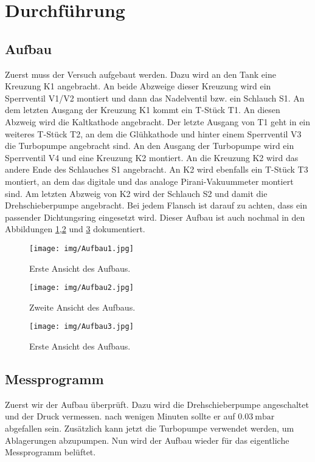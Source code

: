 \section{Durchführung}
\label{sec:Durchführung}
\subsection{Aufbau}
Zuerst muss der Versuch aufgebaut werden. Dazu wird an den Tank eine Kreuzung K1 angebracht. An beide Abzweige dieser Kreuzung wird ein Sperrventil V1/V2
montiert und dann das Nadelventil bzw. ein Schlauch S1. An dem letzten Ausgang der Kreuzung K1 kommt ein T-Stück T1. An diesen Abzweig wird die Kaltkathode
angebracht. Der letzte Ausgang von T1 geht in ein weiteres T-Stück T2, an dem die Glühkathode und hinter einem Sperrventil V3 die Turbopumpe angebracht sind.
An den Ausgang der Turbopumpe wird ein Sperrventil V4 und eine Kreuzung K2 montiert. An die Kreuzung K2 wird das andere Ende des Schlauches S1 angebracht. An K2
wird ebenfalls ein T-Stück T3 montiert, an dem das digitale und das analoge Pirani-Vakuummeter montiert sind. Am letzten Abzweig von K2 wird der Schlauch S2 und
damit die Drehschieberpumpe angebracht. Bei jedem Flansch ist darauf zu achten, dass ein passender Dichtungsring eingesetzt wird. Dieser Aufbau ist auch
nochmal in den Abbildungen \ref{img:ab1},\ref{img:ab2} und \ref{img:ab3} dokumentiert.
\begin{figure}
	\centering
	\texttt{[image: img/Aufbau1.jpg]}
	\caption{Erste Ansicht des Aufbaus.}
	\label{img:ab1}
\end{figure}
\begin{figure}
	\centering
	\texttt{[image: img/Aufbau2.jpg]}
	\caption{Zweite Ansicht des Aufbaus.}
	\label{img:ab2}
\end{figure}
\begin{figure}
	\centering
	\texttt{[image: img/Aufbau3.jpg]}
	\caption{Erste Ansicht des Aufbaus.}
	\label{img:ab3}
\end{figure}
\subsection{Messprogramm}
Zuerst wir der Aufbau überprüft. Dazu wird die Drehschieberpumpe angeschaltet und der Druck vermessen. nach wenigen Minuten sollte er auf
$\SI{0.03}{\milli \bar}$ abgefallen sein. Zusätzlich kann jetzt die Turbopumpe verwendet werden, um Ablagerungen abzupumpen. Nun wird der Aufbau wieder für das
eigentliche Messprogramm belüftet.


